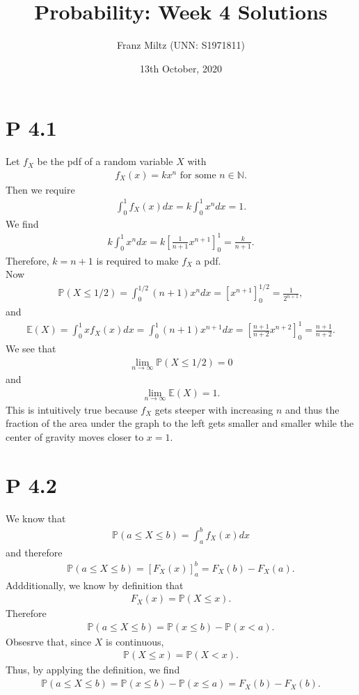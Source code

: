 \documentclass{article}
\newcommand{\N}{\mathbb{N}}
\renewcommand{\P}{\mathbb{P}}
\newcommand{\E}{\mathbb{E}}
\begin{document}
\title{Probability: Week 4 Solutions}
\author{Franz Miltz (UNN: S1971811)}
\date{13th October, 2020}
\maketitle
\section*{P 4.1} 
Let $f_X$ be the pdf of a random variable $X$ with
\begin{align*}
  f_X(x) = k x^n \text{ for some } n\in\N.
\end{align*}
Then we require
\begin{align*}
  \int_0^1 f_X(x) dx = k\int_0^1 x^n dx = 1.
\end{align*}
We find
\begin{align*}
   k\int_0^1 x^n dx = k\left[\frac{1}{n+1}x^{n+1}\right]_0^1 = \frac{k}{n+1}.
\end{align*}
Therefore, $k=n+1$ is required to make $f_X$ a pdf.\\
Now 
\begin{align*}
  \P(X\leq 1/2) = \int_0^{1/2} (n+1)x^n dx = \left[x^{n+1}\right]_0^{1/2} 
  =\frac{1}{2^{n+1}},
\end{align*}
and
\begin{align*}
  \E(X) = \int_0^1 x f_X(x) dx = \int_0^1 (n+1)x^{n+1} dx
  = \left[\frac{n+1}{n+2}x^{n+2}\right]_0^1 = \frac{n+1}{n+2}.
\end{align*}
We see that 
\begin{align*}
  \lim_{n\to\infty} \P(X\leq 1/2) = 0
\end{align*}
and
\begin{align*}
  \lim_{n\to\infty} \E(X) = 1.
\end{align*}
This is intuitively true because $f_X$ gets steeper with increasing
$n$ and thus the fraction of the area under the graph to the left 
gets smaller and smaller while the center of gravity moves closer to
$x=1$.
\section*{P 4.2}
We know that
\begin{align*}
  \P(a \leq X \leq b) = \int_a^b f_X(x) dx 
\end{align*}
and therefore
\begin{align*}
  \P(a \leq X \leq b) = \left[F_X(x)\right]_a^b = F_X(b) - F_X(a).
\end{align*}
Addditionally, we know by definition that
\begin{align*}
  F_X(x) = \P(X \leq x).
\end{align*}
Therefore
\begin{align*}
  \P(a \leq X \leq b) = \P(x \leq b) - \P(x < a).
\end{align*}
Obsesrve that, since $X$ is continuous,
\begin{align*}
  \P(X \leq x) = \P(X < x). 
\end{align*}
Thus, by applying the definition, we find
\begin{align*}
  \P(a \leq X \leq b) = \P(x \leq b) - \P(x \leq a) = F_X(b) - F_X(b).
\end{align*}
\end{document}
